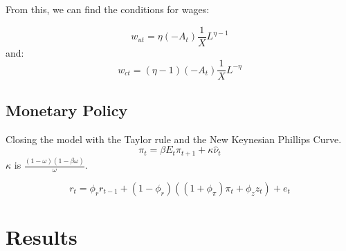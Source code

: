 \documentclass[11pt, a4paper]{article}
\begin{document}
From this, we can find the conditions for wages:

\begin{equation}
  w_{ut} = \eta (-A_t)\frac{1}{X}L^{\eta-1}
\end{equation}
and:
\begin{equation}
 w_{ct} = (\eta -1) (-A_t)\frac{1}{X}L^{-\eta}
\end{equation}








\subsection{Monetary Policy}

Closing the model with the Taylor rule and the New Keynesian Phillips Curve.
\begin{equation}
\pi_{t}=\beta E_{t} \pi_{t+1}+\kappa \hat{\nu}_{t}
\end{equation}
$\kappa$ is $\frac{(1-\omega)(1-\beta \omega)}{\omega}$.

\begin{equation}
	r_{t}=\phi_{r} r_{t-1}+\left(1-\phi_{r}\right)\left(\left(1+\phi_{\pi}\right) \pi_{t}+\phi_{z} z_{t}\right)+e_{t}
\end{equation}





\section{Results}
\end{document}
